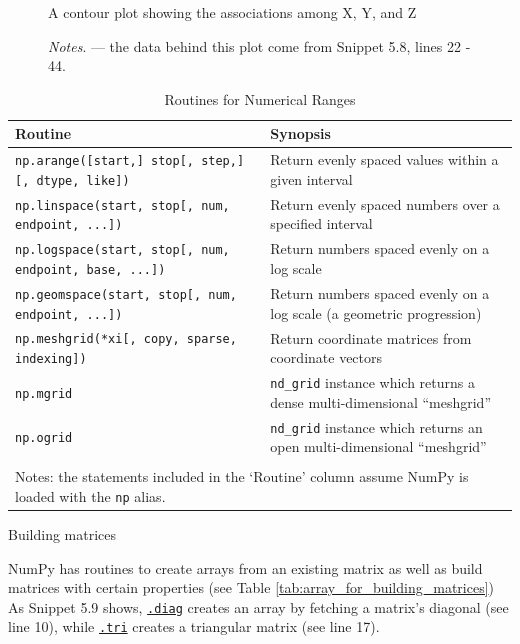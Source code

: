 \documentclass[a4paper,11pt]{book}
\newcommand{\question}[1]{%
    \begin{tcolorbox}[colback=comp_c!10,colframe=comp_c,sidebyside align=top,width=\linewidth,before skip=1ex]
        #1
    \end{tcolorbox}
    \switchcolumn%
}
\newcommand{\note}[1]{%
    \begin{tcolorbox}[colback=white!0,colframe=white!10,width=\linewidth,before skip=1ex]
        #1
    \end{tcolorbox}
}
\begin{document}
\begin{figure}[!htbp]

\caption{A contour plot showing the associations among X, Y, and Z}
\vspace{-0.75em}
\caption*{\textit{Notes}. --- the data behind this plot come from Snippet 5.8, lines 22 - 44.}
\label{fig:contour_plot}
\end{figure}

\begin{table}
	\centering
	\caption{Routines for Numerical Ranges}
	\label{tab:array_from_numerical_ranges}
	\begin{tabular}{lp{12cm}}
		\toprule \toprule
			Routine & Synopsis \\
			\midrule
			\texttt{np.arange([start,] stop[, step,][, dtype, like])}&
			Return evenly spaced values within a given interval\\
			\texttt{np.linspace(start, stop[, num, endpoint, ...])}&
			Return evenly spaced numbers over a specified interval\\
			\texttt{np.logspace(start, stop[, num, endpoint, base, ...])}&
			Return numbers spaced evenly on a log scale\\
			\texttt{np.geomspace(start, stop[, num, endpoint, ...])}&
			Return numbers spaced evenly on a log scale (a geometric progression)\\
			\texttt{np.meshgrid(*xi[, copy, sparse, indexing])}&
			Return coordinate matrices from coordinate vectors\\
			\texttt{np.mgrid}&
			\texttt{nd\_grid} instance which returns a dense multi-dimensional ``meshgrid''\\
			\texttt{np.ogrid}&
			\texttt{nd\_grid} instance which returns an open multi-dimensional ``meshgrid''\\
			\bottomrule \\[-1.8ex]
			\multicolumn{2}{l}{Notes: the statements included in the `Routine' column assume NumPy is loaded with the \texttt{np} alias.} \\
	\end{tabular}
\end{table}
\clearpage

\begin{paracol}{2}
	\question{\raggedright Building matrices}
	\note{NumPy has routines to create arrays from an existing matrix as well as build matrices with certain properties (see Table \ref{tab:array_for_building_matrices}) As Snippet 5.9 shows, \href{https://numpy.org/doc/stable/reference/generated/numpy.diag.html\#numpy.diag}{\texttt{.diag}} creates an array by fetching a matrix's diagonal (see line 10), while \href{https://numpy.org/doc/stable/reference/generated/numpy.tri.html\#numpy.tri}{\texttt{.tri}} creates a triangular matrix (see line 17).}
\end{paracol}
\end{document}
